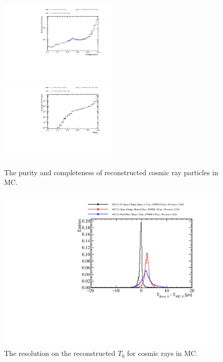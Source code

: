 \begin{figure}
\includegraphics[width=0.5\textwidth]{Figures/Metrics/MC/Cosmics/CosmicRayCompleteness.pdf}
\includegraphics[width=0.5\textwidth]{Figures/Metrics/MC/Cosmics/CosmicRayPurity.pdf}
\caption{The purity and completeness of reconstructed cosmic ray particles in MC.}
\label{fig:4}
\end{figure}

\begin{figure}
\includegraphics[width=1.0\textwidth]{Figures/Metrics/MC/Cosmics/CosmicRayT0Resolustion.pdf}
\caption{The resolution on the reconstructed $T_{0}$ for cosmic rays in MC.}
\label{fig:5}
\end{figure}

